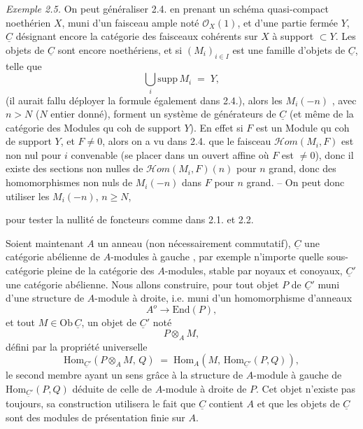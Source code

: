 \documentclass[11pt,a4paper]{article}
\begin{document}
\emph{Exemple 2.5.} On peut généraliser 2.4. en prenant un schéma  quasi-compact  noethérien $X$, muni d'un faisceau ample noté $\mathcal{O}_X(1)$,  et d'une partie fermée $Y$, $\underline{C}$ désignant encore la catégorie des faisceaux cohérents sur $X$ à support $\subset Y$. Les objets de $\underline{C}$ sont encore noethériens, et si $(M_i)_{i \in I}$ est une famille d'objets de $\underline{C}$, telle que 
\[
  \bigcup_i \mathrm{supp}\, M_i \;=\; Y ,
\]
(il aurait fallu déployer la formule également dans 2.4.), alors les $M_i(-n)$ , avec $n > N$ ($N$ entier donné), forment un système de générateurs de $\underline{C}$ (et même de la catégorie des Modules qu coh de support $Y$). En effet si $F$ est un Module qu coh de support $Y$, et $F \neq 0$, alors \struck{\ill{}} on a vu dans 2.4. que le faisceau $\mathcal{H}om(M_i,F)$ est non nul pour $i$ convenable (se placer dans un ouvert affine où $F$ est $\neq 0$), donc il existe des sections non nulles de $\mathcal{H}om(M_i,F)(n)$ pour $n$ grand, donc des homomorphismes non nuls de $M_i(-n)$ dans $F$ pour $n$ grand. -- On peut donc utiliser les $M_i(-n)$, $n \geqslant N$,

pour tester la nullité de foncteurs comme dans 2.1. et 2.2.

Soient maintenant $A$ un anneau (non nécessairement commutatif), $\underline{C}$ une catégorie abélienne de $A$-modules à gauche , par exemple n'importe quelle sous-catégorie pleine  de la catégorie des $A$-modules, stable par noyaux et conoyaux, $\underline{C}'$ une catégorie abélienne. Nous allons construire, pour tout objet $P$ de $\underline{C}'$ muni d'une structure de $A$-module à droite, i.e. muni d'un homomorphisme d'anneaux
\[
  A^{o} \longrightarrow \mathrm{End}(P) ,
\]
et tout $M \in \mathrm{Ob}\,\underline{C}$, un objet de $\underline{C}'$ noté
\[
  P \otimes_A M ,
\]
défini par la propriété universelle
\[
  \mathrm{Hom}_{\underline{C}'}(P \otimes_A M,\, Q) \;=\; \mathrm{Hom}_A(M,\, \mathrm{Hom}_{\underline{C}'}(P,Q)) ,
\]
le second membre ayant un sens grâce à la structure de $A$-module à gauche de $\mathrm{Hom}_{\underline{C}'}(P,Q)$ déduite de celle de $A$-module à droite de $P$. Cet objet n'existe pas toujours, sa construction   utilisera le fait que \struck{\ill{}} $\underline{C}$ contient $A$ et que les objets de $\underline{C}$ sont des modules de présentation finie sur $A$.
\end{document}
